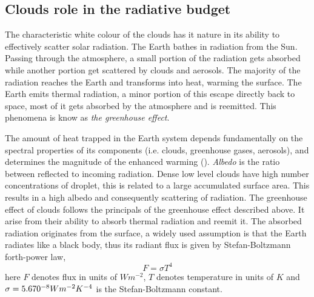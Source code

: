 
\subsection{Clouds role in the radiative budget}
The characteristic white colour of the clouds has it nature in its ability to  effectively scatter solar radiation. %
The Earth bathes in radiation from the Sun. Passing through the atmosphere, a small portion of the radiation gets absorbed while another portion get scattered by clouds and aerosols. The majority of the radiation reaches the Earth and transforms into heat, warming the surface. The Earth emits thermal radiation, a minor portion of this escape directly back to space, most of it gets absorbed by the atmosphere and is reemitted. This phenomena is know as \textit{the greenhouse effect}. 


The amount of heat trapped in the Earth system depends fundamentally on the spectral properties of its components (i.e. clouds, greenhouse gases, aerosols), and determines the magnitude of the enhanced warming (\cite{greenhouse_effect}).
\textit{Albedo} is the ratio between reflected to incoming radiation. Dense low level clouds have high number concentrations of droplet, this is related to a large accumulated surface area. This results in a high albedo and consequently scattering of radiation. The greenhouse effect of clouds follows the principals of the greenhouse effect described above. It arise from their ability to absorb thermal radiation and reemit it. The absorbed radiation originates from the surface, a widely used assumption is that the Earth radiates like a black body, thus its radiant flux is given by Stefan-Boltzmann forth-power law, 
\begin{equation} \label{eq:stefan-boltzmann}
    F = \sigma  T ^4 %
\end{equation}
here $F$ denotes flux in units of $W m^{-2}$, $T$ denotes temperature in units of $K$ and \\  $\sigma = 5.670 \time 10^{-8} W m^{-2} K^{-4}$ is the Stefan-Boltzmann constant. 

